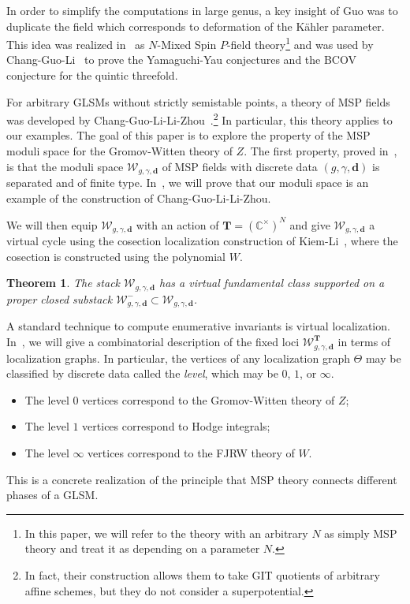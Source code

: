 \documentclass{amsart}
\newtheorem{thm}{Theorem}[section]
\theoremstyle{definition}
\theoremstyle{remark}
\theoremstyle{plain}
\theoremstyle{definition}
\theoremstyle{remark}
\newcommand{\C}{\mathbb{C}}
\newcommand{\T}{\mathbf{T}}
\newcommand{\bd}{\mathbf{d}}
\newcommand{\mc}[1]{\mathcal{#1}}
\newcommand{\1}{\mathbf{1}}
\newcommand{\2}{\mathbf{2}}
\newcommand{\3}{\mathbf{3}}
\begin{document}
In order to simplify the computations in large genus, a key insight of Guo was to duplicate the field which corresponds to deformation of the K\"ahler parameter. This idea was realized in~\cite{nmsp} as $N$-Mixed Spin $P$-field theory\footnote{In this paper, we will refer to the theory with an arbitrary $N$ as simply MSP theory and treat it as depending on a parameter $N$.} and was used by Chang-Guo-Li~\cite{nmsp2, nmsp3} to prove the Yamaguchi-Yau conjectures and the BCOV conjecture for the quintic threefold. 

For arbitrary GLSMs without strictly semistable points, a theory of MSP fields was developed by Chang-Guo-Li-Li-Zhou~\cite{generalmsp}.\footnote{In fact, their construction allows them to take GIT quotients of arbitrary affine schemes, but they do not consider a superpotential.} In particular, this theory applies to our examples. The goal of this paper is to explore the property of the MSP moduli space for the Gromov-Witten theory of $Z$. The first property, proved in~\cite{generalmsp}, is that the moduli space $\mc{W}_{g,\gamma,\bd}$ of MSP fields with discrete data $(g,\gamma, \bd)$ is separated and of finite type. In~, we will prove that our moduli space is an example of the construction of Chang-Guo-Li-Li-Zhou.

We will then equip $\mc{W}_{g,\gamma,\bd}$ with an action of $\T = (\C^{\times})^N$ and give $\mc{W}_{g,\gamma,\bd}$ a virtual cycle using the cosection localization construction of Kiem-Li~\cite{cosection}, where the cosection is constructed using the polynomial $W$.
\begin{thm}
    The stack $\mc{W}_{g,\gamma,\bd}$ has a virtual fundamental class supported on a proper closed substack $\mc{W}_{g,\gamma,\bd}^- \subset \mc{W}_{g,\gamma,\bd}$.
\end{thm}

A standard technique to compute enumerative invariants is virtual localization. In~, we will give a combinatorial description of the fixed loci $\mc{W}_{g,\gamma,\bd}^{\T}$ in terms of localization graphs. In particular, the vertices of any localization graph $\Theta$ may be classified by discrete data called the \textit{level}, which may be $0$, $1$, or $\infty$.
\begin{itemize}
    \item The level $0$ vertices correspond to the Gromov-Witten theory of $Z$;
    \item The level $1$ vertices correspond to Hodge integrals;
    \item The level $\infty$ vertices correspond to the FJRW theory of $W$.
\end{itemize}
This is a concrete realization of the principle that MSP theory connects different phases of a GLSM.
\end{document}
